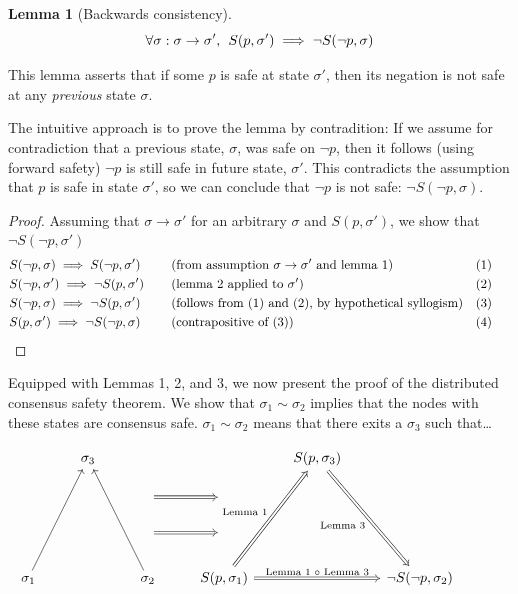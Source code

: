 \documentclass{article}
\theoremstyle{definition}
\newtheorem{lemma}{Lemma}
\begin{document}
\begin{lemma}[Backwards consistency]
$$
\forall \sigma:\sigma \to \sigma',\hspace{1.5mm} S(p,\sigma') \implies \neg{S(\neg{p},\sigma)}
$$
\end{lemma}

This lemma asserts that if some $p$ is safe at state $\sigma'$, then its negation is not safe at any \emph{previous} state $\sigma$.

The intuitive approach is to prove the lemma by contradition: If we assume for contradiction that a previous state, $\sigma$, was safe on $\neg{p}$, then it follows (using forward safety) $\neg{p}$ is still safe in future state, $\sigma'$. This contradicts the assumption that $p$ is safe in state $\sigma'$, so we can conclude that $\neg{p}$ is not safe: $\neg{S(\neg{p},\sigma)}$.

\begin{proof}
  Assuming that $\sigma \to \sigma'$ for an arbitrary $\sigma$ and $S(p,\sigma')$, we show that $\neg{S(\neg{p},\sigma')}$
  \begin{align*}
    &S(\neg{p},\sigma) \implies S(\neg{p},\sigma') &&\text{(from assumption $\sigma \to \sigma'$ and lemma 1)}   &&\text{(1)} \\
    &S(\neg{p},\sigma') \implies \neg{S(p,\sigma')} &&\text{(lemma 2 applied to $\sigma'$) }   &&\text{(2)} \\
    &S(\neg{p},\sigma) \implies \neg{S(p,\sigma')} &&\text{(follows from (1) and (2), by hypothetical syllogism)} &&\text{(3)} \\
    &S(p,\sigma') \implies \neg{S(\neg{p},\sigma)} \hspace{5mm} \qedhere &&\text{(contrapositive of (3))} &&\text{(4)} \hspace{5mm}
  \end{align*}
\end{proof}

\vspace{5mm}

Equipped with Lemmas 1, 2, and 3, we now present the proof of the distributed consensus safety theorem. We show that $\sigma_1 \sim \sigma_2$ implies that the nodes with these states are consensus safe. $\sigma_1 \sim \sigma_2$ means that there exits a $\sigma_3$ such that\ldots


\begin{equation*}
\begin{tikzcd}
{}
  &
\sigma_3
  &
{}
  &
{}
  &
S(p,\sigma_3)
  &
{}
  &
{}
  \\ 
{}
  &
{}
  &
{}
  \arrow[r,Rightarrow,""]
  &
{}
  &
{}
  &
{}
  &
{}
  \\
{}
  &
{}
  &
{}
  \arrow[r,Rightarrow,""]
  &
{}
  &
{}
  &
{}
  &
{}
  \\
\sigma_1
  \arrow[uuur,""]
  &
{}
  &
\sigma_2
  \arrow[uuul,""]
{}
  &
S(p,\sigma_1)
  \arrow[uuur,Rightarrow,"\text{Lemma 1}"]
  \arrow[rr,Rightarrow,"\text{Lemma 1 $\circ$ Lemma 3}"]
  &
{}
  &
\neg{S(\neg{p},\sigma_2)}
  \arrow[uuul,Leftarrow,"\text{Lemma 3}"] 
\end{tikzcd}
\end{equation*}
\end{document}
